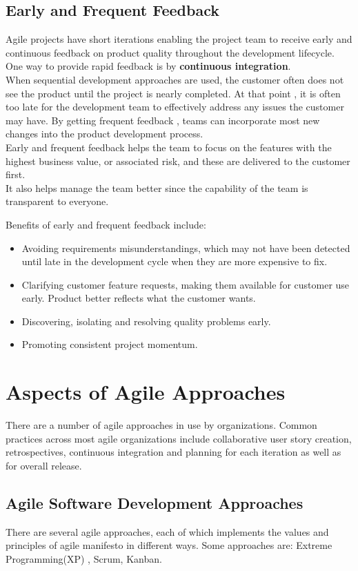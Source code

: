 \documentclass[12pt,a4paper,violet]{bbe}
\begin{document}
    \subsection{Early and Frequent Feedback}
    Agile projects have short iterations enabling the project team to receive early and continuous feedback on product quality throughout the development lifecycle. One way to provide rapid feedback is by \textbf{continuous integration}. \\
    When sequential development approaches are used, the customer often does not see the product until the project is nearly completed. At that point , it is often too late for the development team to effectively address any issues the customer may have. By getting frequent feedback , teams can incorporate most new changes into the product development process. \\
    Early and frequent feedback helps the team to focus on the features with the highest business value, or associated risk, and these are delivered to the customer first.\\
    It also helps manage the team better since the capability of the team is transparent to everyone.
    \begin{remark}
    Benefits of early and frequent feedback include:
    \begin{itemize}
        \item Avoiding requirements misunderstandings, which may not have been detected until late in the development cycle when they are more expensive to fix.
        \item Clarifying customer feature requests, making them available for customer use early. Product better reflects what the customer wants.
        \item Discovering, isolating and resolving quality problems early.
        \item Promoting consistent project momentum.
    \end{itemize}
    \end{remark}
\section{Aspects of Agile Approaches}    
There are a number of agile approaches in  use by organizations. Common practices across most agile organizations include collaborative user story creation, retrospectives, continuous integration and planning for each iteration as well as for overall release.
\subsection{Agile Software Development Approaches}
There are several agile approaches, each of which implements the values and principles of agile manifesto in different ways. Some approaches are: Extreme Programming(XP) , Scrum, Kanban.
\end{document}
